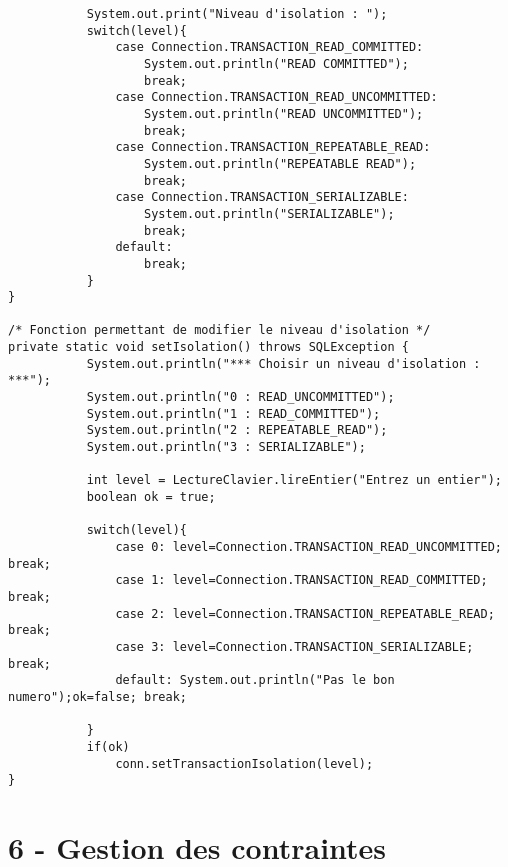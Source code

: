 \documentclass{article}
\begin{document}
\begin{enumerate}[label=\arabic*)]
\begin{lstlisting}
           System.out.print("Niveau d'isolation : ");
           switch(level){
               case Connection.TRANSACTION_READ_COMMITTED:
                   System.out.println("READ COMMITTED");
                   break;
               case Connection.TRANSACTION_READ_UNCOMMITTED:
                   System.out.println("READ UNCOMMITTED");
                   break;
               case Connection.TRANSACTION_REPEATABLE_READ:
                   System.out.println("REPEATABLE READ");
                   break;
               case Connection.TRANSACTION_SERIALIZABLE:
                   System.out.println("SERIALIZABLE");
                   break;
               default:
                   break;
           }
}

/* Fonction permettant de modifier le niveau d'isolation */
private static void setIsolation() throws SQLException {
           System.out.println("*** Choisir un niveau d'isolation : ***");
           System.out.println("0 : READ_UNCOMMITTED");
           System.out.println("1 : READ_COMMITTED");
           System.out.println("2 : REPEATABLE_READ");
           System.out.println("3 : SERIALIZABLE");
                  
           int level = LectureClavier.lireEntier("Entrez un entier");
           boolean ok = true;
            
           switch(level){
               case 0: level=Connection.TRANSACTION_READ_UNCOMMITTED; break;
               case 1: level=Connection.TRANSACTION_READ_COMMITTED; break;
               case 2: level=Connection.TRANSACTION_REPEATABLE_READ; break;
               case 3: level=Connection.TRANSACTION_SERIALIZABLE; break;
               default: System.out.println("Pas le bon numero");ok=false; break;
               
           }
           if(ok)
               conn.setTransactionIsolation(level);
}
	\end{lstlisting}	

\end{enumerate}

\section*{6 - Gestion des contraintes}
\end{document}
